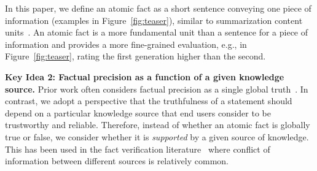 \documentclass[11pt]{article}
\newcommand{\sewon}[1]{\textcolor{magenta}{[Sewon: #1]}
}
\newcommand{\kalpesh}[1]{\textcolor{brown}{[Kalpesh: #1]}
}
\newcommand{\pw}[1]{%
}
\begin{document}
In this paper, we define an atomic fact as a short sentence conveying one piece of information (examples in Figure~\ref{fig:teaser}), similar to summarization content units~\citep{nenkova2004evaluating}.
%
An atomic fact is a more fundamental unit than a sentence for a piece of information and provides a more fine-grained evaluation, e.g., in Figure~\ref{fig:teaser}, rating the first generation higher than the second.

\vspace{.3em}
\noindent
\textbf{Key Idea 2: Factual precision as a function of a given knowledge source.}
Prior work often considers factual precision as a single global truth~\citep{manakul2023selfcheckgpt}.
In contrast, we adopt a perspective that the truthfulness of a statement should depend on a particular knowledge source that end users consider to be trustworthy and reliable.
Therefore, instead of whether an atomic fact is globally true or false, we consider whether it is {\em supported} by a given source of knowledge.
This has been used in the fact verification literature~\citep{wadden2022scifact} where conflict of information between different sources is relatively common.
\end{document}
